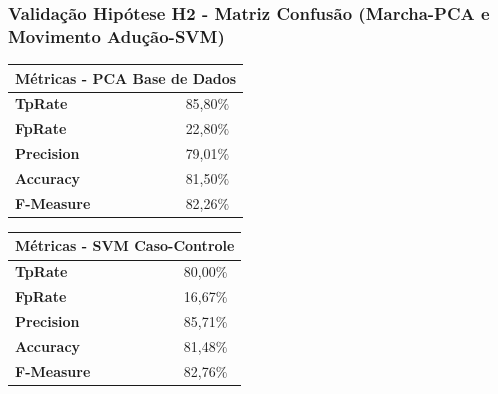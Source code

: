 \documentclass{beamer}
\begin{document}
\begin{frame}
   \frametitle{Validação Hipótese H2 - Matriz Confusão (Marcha-PCA e Movimento Adução-SVM)}
		\begin{block}{}
				\begin{table}
				\label{table:metricasmatrizconfusaosvm}
				\centering
				\begin{tabular}{|l|r|}
				\hline
				\multicolumn{2}{|l|}{\textbf{Métricas - PCA Base de Dados}} \\ \hline
				\textbf{TpRate}                    & 85,80$\%$\                 \\ \hline
				\textbf{FpRate}                    & 22,80$\%$\                \\ \hline
				\textbf{Precision}                 & 79,01$\%$\                \\ \hline
				\textbf{Accuracy}                  & 81,50$\%$\                \\ \hline
				\textbf{F-Measure}                 & 82,26$\%$\                \\ \hline
				\end{tabular}
				\end{table}
    \end{block} 
	
	\begin{block}{}
   		\begin{table}[!htbp]
				\label{table:metricasmatrizconfusao}
				\centering
				\begin{tabular}{|l|r|}
				\hline
				\multicolumn{2}{|l|}{\textbf{Métricas - SVM Caso-Controle}} \\ \hline
				\textbf{TpRate}                    & 80,00$\%$\                 \\ \hline
				\textbf{FpRate}                    & 16,67$\%$\                \\ \hline
				\textbf{Precision}                 & 85,71$\%$\                \\ \hline
				\textbf{Accuracy}                  & 81,48$\%$\                \\ \hline
				\textbf{F-Measure}                 & 82,76$\%$\                \\ \hline
				\end{tabular}
				\end{table}
	\end{block}

\end{frame}
\end{document}
